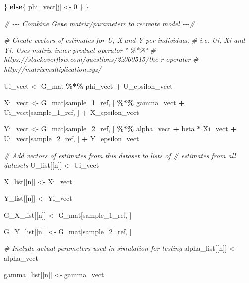 \documentclass[
]{article}
\newenvironment{Shaded}{\begin{snugshade}}{\end{snugshade}}
\newcommand{\CommentTok}[1]{\textcolor[rgb]{0.56,0.35,0.01}{\textit{#1}}}
\newcommand{\ControlFlowTok}[1]{\textcolor[rgb]{0.13,0.29,0.53}{\textbf{#1}}}
\newcommand{\DecValTok}[1]{\textcolor[rgb]{0.00,0.00,0.81}{#1}}
\newcommand{\NormalTok}[1]{#1}
\newcommand{\OtherTok}[1]{\textcolor[rgb]{0.56,0.35,0.01}{#1}}
\newcommand{\SpecialCharTok}[1]{\textcolor[rgb]{0.81,0.36,0.00}{\textbf{#1}}}
\begin{document}
\begin{Shaded}
\begin{Highlighting}[]
\NormalTok{       \}}
       \ControlFlowTok{else}\NormalTok{\{}
\NormalTok{         phi\_vect[j] }\OtherTok{\textless{}{-}} \DecValTok{0}
\NormalTok{       \}}
\NormalTok{     \}}

    \CommentTok{\# {-}{-}{-} Combine Gene matrix/parameters to recreate model {-}{-}{-}\#}

    \CommentTok{\# Create vectors of estimates for U, X and Y per individual,}
    \CommentTok{\# i.e. Ui, Xi and Yi. Uses matrix inner product operator " \%*\%"}
    \CommentTok{\# https://stackoverflow.com/questions/22060515/the{-}r{-}operator}
    \CommentTok{\# http://matrixmultiplication.xyz/}

\NormalTok{     Ui\_vect }\OtherTok{\textless{}{-}}\NormalTok{  G\_mat }\SpecialCharTok{\%*\%}\NormalTok{ phi\_vect }\SpecialCharTok{+}\NormalTok{ U\_epsilon\_vect}

\NormalTok{     Xi\_vect }\OtherTok{\textless{}{-}}\NormalTok{  G\_mat[sample\_1\_ref, ] }\SpecialCharTok{\%*\%}\NormalTok{ gamma\_vect }\SpecialCharTok{+}
\NormalTok{       Ui\_vect[sample\_1\_ref, ] }\SpecialCharTok{+}
\NormalTok{       X\_epsilon\_vect}

\NormalTok{     Yi\_vect }\OtherTok{\textless{}{-}}\NormalTok{  G\_mat[sample\_2\_ref, ] }\SpecialCharTok{\%*\%}\NormalTok{ alpha\_vect }\SpecialCharTok{+}
\NormalTok{       beta }\SpecialCharTok{*}\NormalTok{ Xi\_vect }\SpecialCharTok{+}
\NormalTok{       Ui\_vect[sample\_2\_ref, ] }\SpecialCharTok{+}
\NormalTok{       Y\_epsilon\_vect}

    \CommentTok{\# Add vectors of estimates from this dataset to lists of}
    \CommentTok{\# estimates from all datasets}
\NormalTok{     U\_list[[n]] }\OtherTok{\textless{}{-}}\NormalTok{ Ui\_vect}

\NormalTok{     X\_list[[n]] }\OtherTok{\textless{}{-}}\NormalTok{ Xi\_vect}

\NormalTok{     Y\_list[[n]] }\OtherTok{\textless{}{-}}\NormalTok{ Yi\_vect}

\NormalTok{     G\_X\_list[[n]] }\OtherTok{\textless{}{-}}\NormalTok{ G\_mat[sample\_1\_ref, ]}

\NormalTok{     G\_Y\_list[[n]] }\OtherTok{\textless{}{-}}\NormalTok{ G\_mat[sample\_2\_ref, ]}

    \CommentTok{\# Include actual parameters used in simulation for testing}
\NormalTok{     alpha\_list[[n]] }\OtherTok{\textless{}{-}}\NormalTok{ alpha\_vect}

\NormalTok{     gamma\_list[[n]] }\OtherTok{\textless{}{-}}\NormalTok{ gamma\_vect}


\end{Highlighting}
\end{Shaded}
\end{document}
